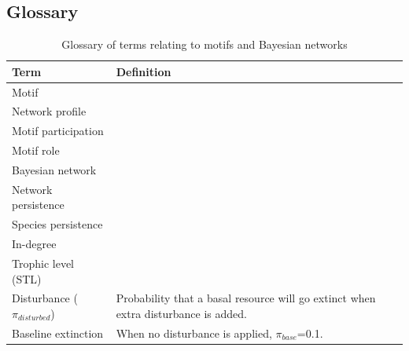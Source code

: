 \documentclass[12pt]{article}
\begin{document}
\begin{spacing}{2.0}
    




    

\section*{Glossary}

\begin{table}[h!]
\label{glossary}
\caption{Glossary of terms relating to motifs and Bayesian networks}

\begin{tabular}{l|l}
    Term & Definition \\
    \hline
    Motif &  \\
    Network profile & \\
    Motif participation & \\
    Motif role & \\
    Bayesian network & \\
    Network persistence & \\
    Species persistence & \\
    In-degree & \\
    Trophic level (STL) & \\
    Disturbance ($\pi_{disturbed}$) & Probability that a basal resource will go extinct when extra disturbance is added. \\
    Baseline extinction&  When no disturbance is applied, $\pi_{base}$=0.1.\\
\end{tabular}
\end{table}



 

\end{spacing}
\end{document}
